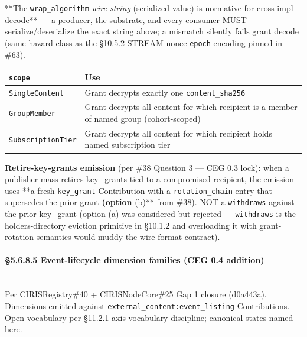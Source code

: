 \documentclass[11pt]{article}
\begin{document}
**The \texttt{wrap\_algorithm} \textit{wire string} (serialized value) is normative for cross-impl decode** — a producer, the substrate, and every consumer MUST serialize/deserialize the exact string above; a mismatch silently fails grant decode (same hazard class as the §10.5.2 STREAM-nonce \texttt{epoch} encoding pinned in \#63).


{\footnotesize
\begin{longtable}{|p{8.0cm}|p{8.0cm}|}\hline
\textbf{\texttt{scope}} & \textbf{Use} \\ \hline\endhead
\texttt{SingleContent} & Grant decrypts exactly one \texttt{content\_sha256} \\ \hline
\texttt{GroupMember} & Grant decrypts all content for which recipient is a member of named group (cohort-scoped) \\ \hline
\texttt{SubscriptionTier} & Grant decrypts all content for which recipient holds named subscription tier \\ \hline
\end{longtable}}


\textbf{Retire-key-grants emission} (per \#38 Question 3 — CEG 0.3 lock): when a publisher mass-retires key\_grants tied to a compromised recipient, the emission uses **a fresh \texttt{key\_grant} Contribution with a \texttt{rotation\_chain} entry that supersedes the prior grant\textbf{ (option }(b)** from \#38). NOT a \texttt{withdraws} against the prior key\_grant (option (a) was considered but rejected — \texttt{withdraws} is the holders-directory eviction primitive in §10.1.2 and overloading it with grant-rotation semantics would muddy the wire-format contract).



\paragraph{§5.6.8.5 Event-lifecycle dimension families (CEG 0.4 addition)}\mbox{}\\


Per CIRISRegistry\#40 + CIRISNodeCore\#25 Gap 1 closure (d0a443a). Dimensions emitted against \texttt{external\_content:event\_listing} Contributions. Open vocabulary per §11.2.1 axis-vocabulary discipline; canonical states named here.
\end{document}
